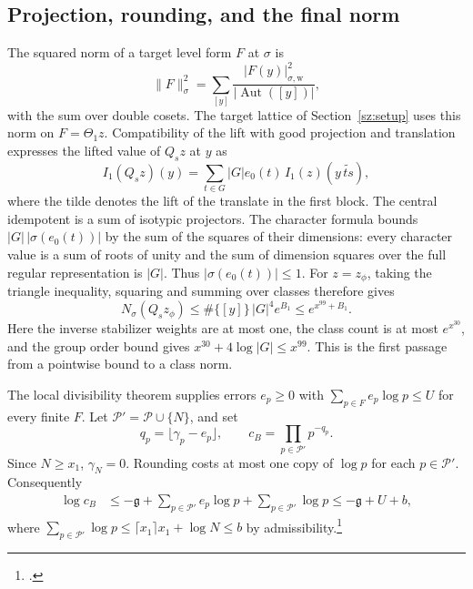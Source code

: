 \subsection{Projection, rounding, and the final norm}
The squared norm of a target level form $F$ at $\sigma$ is
\[
 \|F\|_\sigma^2=\sum_{[y]}\frac{|F(y)|_{\sigma,\mathrm w}^2}{|\operatorname{Aut}([y])|},
\]
with the sum over double cosets. The target lattice of Section~\ref{sz:setup} uses this norm on $F=\Theta_1 z$. Compatibility of the lift with good projection and translation expresses the lifted value of $Q_s z$ at $y$ as
\[
 I_1(Q_s z)(y)=\sum_{t\in G}|G|e_0(t)\,I_1(z)(y\,\widetilde{ts}),
\]
where the tilde denotes the lift of the translate in the first block. The central idempotent is a sum of isotypic projectors. The character formula bounds $|G|\,|\sigma(e_0(t))|$ by the sum of the squares of their dimensions: every character value is a sum of roots of unity and the sum of dimension squares over the full regular representation is $|G|$. Thus $|\sigma(e_0(t))|\le1$. For $z=z_\phi$, taking the triangle inequality, squaring and summing over classes therefore gives
\begin{equation}
 N_\sigma(Q_s z_\phi)\le \#\{[y]\}\,|G|^4 e^{B_1}\le e^{x^{99}+B_1}.
 \label{A:proj}
\end{equation}
Here the inverse stabilizer weights are at most one, the class count is at most $e^{x^{30}}$, and the group order bound gives $x^{30}+4\log|G|\le x^{99}$. This is the first passage from a pointwise bound to a class norm.

The local divisibility theorem supplies errors $e_p\ge0$ with $\sum_{p\in F}e_p\log p\le U$ for every finite $F$. Let $\mathcal P'=\mathcal P\cup\{N\}$, and set
\[
 q_p=\lfloor\gamma_p-e_p\rfloor,\qquad c_B=\prod_{p\in\mathcal P'}p^{-q_p}.
\]
Since $N\ge x_1$, $\gamma_N=0$. Rounding costs at most one copy of $\log p$ for each $p\in\mathcal P'$. Consequently
\begin{align}
 \log c_B&\le-\mathfrak g+\sum_{p\in\mathcal P'}e_p\log p+\sum_{p\in\mathcal P'}\log p
          \le-\mathfrak g+U+b,\label{A:floor}
\end{align}
where $\sum_{p\in\mathcal P'}\log p\le\lceil x_1\rceil x_1+\log N\le b$ by admissibility.\footnote{.}

